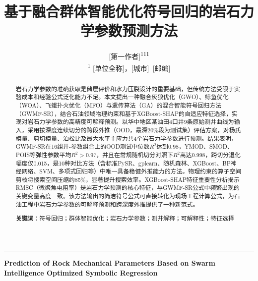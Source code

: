 \documentclass[a4paper,12pt]{ctexart}
\begin{document}
\title{\LARGE\textbf{基于融合群体智能优化符号回归的岩石力学参数预测方法}}
\author{
  {[第一作者]}\textsuperscript{1}\quad {[第二作者]}\textsuperscript{1}\quad {[第三作者]}\textsuperscript{1} \\[6pt]
  \small \textsuperscript{1} [单位全称]，[城市]~[邮编]
}
\date{}
\maketitle

\begin{abstract}
岩石力学参数的准确获取是储层评价和水力压裂设计的重要基础，但传统方法受限于实验成本和经验公式泛化能力不足。本文提出一种融合灰狼优化（GWO）、鲸鱼优化（WOA）、飞蛾扑火优化（MFO）与遗传算法（GA）的混合智能符号回归方法（GWMF-SR），结合石油领域物理约束和基于XGBoost-SHAP的自适应特征选择，实现对岩石力学参数的高精度可解释预测。以华中地区某油田4口井9条原始测井曲线为输入，采用按深度连续切分的跨段外推（OOD，最深20\%段为测试集）评估方案，对杨氏模量、剪切模量、泊松比及最大水平主应力共4个岩石力学参数进行预测。结果表明，GWMF-SR在16组井-参数组合上的OOD测试中位数$R^2$达到0.98，YMOD、SMOD、POIS等弹性参数平均$R^2>0.97$，并且在常规随机切分对照下$R^2$高达0.998，跨切分退化幅度仅0.015，是10种对比方法（含标准PySR、gplearn、随机森林、XGBoost、BP神经网络、SVM、多项式回归等）中唯一具备稳健外推能力的方法。物理约束的算子空间剪枝将搜索空间压缩约85\%，显著提升搜索效率。XGBoost-SHAP特征重要性分析揭示RMSC（微聚焦电阻率）是岩石力学预测的核心特征，与GWMF-SR公式中频繁出现的关键变量高度一致。该方法输出的简洁符号公式可直接转化为现场工程计算公式，为石油工程中岩石力学参数的可解释预测和跨深度外推提供了一种新范式。

\noindent\textbf{关键词}：符号回归；群体智能优化；岩石力学参数；测井解释；可解释性；特征选择
\end{abstract}

\vspace{1em}
\noindent\rule{\textwidth}{0.4pt}
\vspace{0.5em}

{\noindent\large\textbf{Prediction of Rock Mechanical Parameters Based on Swarm Intelligence Optimized Symbolic Regression}}
\end{document}

